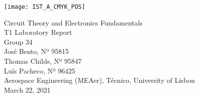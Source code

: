 
\thispagestyle {empty}

\texttt{[image: IST\_A\_CMYK\_POS]}

\begin{center}
%
\vspace{1.0cm}

\vspace{1cm}
{\FontLb Circuit Theory and Electronics Fundamentals} \\ %
\vspace{5cm}
{\FontLn T1 Laboratory Report}\vspace{1cm} \\
\vspace{5cm}
{\FontLb Group 34} \\
\vspace{1cm}
{\FontSn José Bento, Nº 95815} \\
{\FontSn Thomas Childs, Nº 95847} \\
{\FontSn Luís Pacheco, Nº 96425} \\
\vspace{1cm}
{\FontSn Aerospace Engineering (MEAer), Técnico, University of Lisbon} \\ %
\vspace{1cm}
{\FontSn March 22, 2021} \\ %
%
\end{center}

